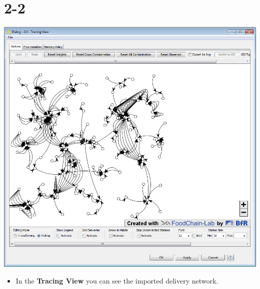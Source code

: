 \documentclass{beamer}
\begin{document}
\section{2-2}
\begin{frame}
	\begin{center}
  		\includegraphics[height=0.6\textheight]{2-2.png}
	\end{center}
	\begin{itemize}
		\item In the \textbf{Tracing View} you can see the imported delivery network.
	\end{itemize}
\end{frame}
\end{document}

